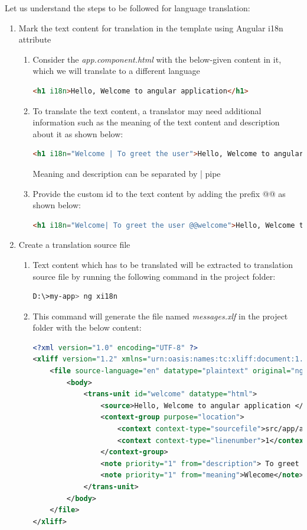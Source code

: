 \documentclass{report}
\begin{document}
Let us understand the steps to be followed for language translation:
\begin{enumerate}
	\item{Mark the text content for translation in the template using Angular i18n attribute}
		\begin{enumerate}
			\item{Consider the \textit{app.component.html} with the below-given content in it, which we will translate to a different language}
				\begin{lstlisting}[language=HTML, caption=app.component.html]
				<h1 i18n>Hello, Welcome to angular application</h1>
			\end{lstlisting}
		\item{To translate the text content, a translator may need additional information such as the meaning of the text content and description about it as shown below:}
				\begin{lstlisting}[language=HTML, caption=app.component.html]
				<h1 i18n="Welcome | To greet the user">Hello, Welcome to angular application</h1>
		\end{lstlisting}
		Meaning and description can be separated by | pipe
	\item{Provide the custom id to the text content by adding the prefix @@ as shown below:}
				\begin{lstlisting}[language=HTML, caption=app.component.html]
				<h1 i18n="Welcome| To greet the user @@welcome">Hello, Welcome to angular application</h1>
	\end{lstlisting}

\end{enumerate}

\item{Create a translation source file}
	\begin{enumerate}
		\item{Text content which has to be translated will be extracted to translation source file by running the following command in the project folder:}
		\begin{lstlisting}[language=bash]
		D:\>my-app> ng xi18n
		\end{lstlisting}
	\item{This command will generate the file named \textit{messages.xlf} in the project folder with the below content:}
		\begin{lstlisting}[language=XML, caption=messages.xlf]
<?xml version="1.0" encoding="UTF-8" ?>
<xliff version="1.2" xmlns="urn:oasis:names:tc:xliff:document:1.2">
	<file source-language="en" datatype="plaintext" original="ng2.template">
		<body>
			<trans-unit id="welcome" datatype="html">
				<source>Hello, Welcome to angular application </source>
				<context-group purpose="location">
					<context context-type="sourcefile">src/app/app.component.html</context>
					<context context-type="linenumber">1</context>
				</context-group>
				<note priority="1" from="description"> To greet the user </note>
				<note priority="1" from="meaning">Wlecome</note>
			</trans-unit>
		</body>
	</file>
</xliff>
	\end{lstlisting}


\end{enumerate}
\end{enumerate}
\end{document}
